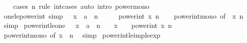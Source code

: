 \begin{isabellebody}
%
\isadelimproof
\ \ %
\endisadelimproof
%
\isatagproof
{}\isamarkupfalse%
\ {\isacharparenleft}{\kern0pt}cases\ n\ rule{\isacharcolon}{\kern0pt}\ int{\isacharunderscore}{\kern0pt}cases{}{\isacharparenright}{\kern0pt}\ {\isacharparenleft}{\kern0pt}auto\ intro{\isacharcolon}{\kern0pt}\ power{\isacharunderscore}{\kern0pt}mono{\isacharparenright}{\kern0pt}%
\endisatagproof
{\isafoldproof}%
%
\isadelimproof
\isanewline
%
\endisadelimproof
\isanewline
{}\isamarkupfalse%
\ one{\isacharunderscore}{\kern0pt}le{\isacharunderscore}{\kern0pt}power{\isacharunderscore}{\kern0pt}int\ {\isacharbrackleft}{\kern0pt}simp{\isacharbrackright}{\kern0pt}{\isacharcolon}{\kern0pt}\ {\isachardoublequoteopen}{}\ {\isasymle}\ {\isacharparenleft}{\kern0pt}x\ {\isacharcolon}{\kern0pt}{\isacharcolon}{\kern0pt}\ {\isacharprime}{\kern0pt}a{\isacharparenright}{\kern0pt}\ {\isasymLongrightarrow}\ n\ {\isasymge}\ {}\ {\isasymLongrightarrow}\ {}\ {\isasymle}\ power{\isacharunderscore}{\kern0pt}int\ x\ n{\isachardoublequoteclose}\isanewline
%
\isadelimproof
\ \ %
\endisadelimproof
%
\isatagproof
{}\isamarkupfalse%
\ power{\isacharunderscore}{\kern0pt}int{\isacharunderscore}{\kern0pt}mono\ {\isacharbrackleft}{\kern0pt}of\ {}\ x\ n{\isacharbrackright}{\kern0pt}\ \isamarkupfalse%
\ simp%
\endisatagproof
{\isafoldproof}%
%
\isadelimproof
\isanewline
%
\endisadelimproof
\isanewline
{}\isamarkupfalse%
\ power{\isacharunderscore}{\kern0pt}int{\isacharunderscore}{\kern0pt}le{\isacharunderscore}{\kern0pt}one{\isacharcolon}{\kern0pt}\ {\isachardoublequoteopen}{}\ {\isasymle}\ {\isacharparenleft}{\kern0pt}x\ {\isacharcolon}{\kern0pt}{\isacharcolon}{\kern0pt}\ {\isacharprime}{\kern0pt}a{\isacharparenright}{\kern0pt}\ {\isasymLongrightarrow}\ n\ {\isasymge}\ {}\ {\isasymLongrightarrow}\ x\ {\isasymle}\ {}\ {\isasymLongrightarrow}\ power{\isacharunderscore}{\kern0pt}int\ x\ n\ {\isasymle}\ {}{\isachardoublequoteclose}\isanewline
%
\isadelimproof
\ \ %
\endisadelimproof
%
\isatagproof
{}\isamarkupfalse%
\ power{\isacharunderscore}{\kern0pt}int{\isacharunderscore}{\kern0pt}mono\ {\isacharbrackleft}{\kern0pt}of\ x\ {}\ n{\isacharbrackright}{\kern0pt}\ \isamarkupfalse%
\ simp%
\endisatagproof
{\isafoldproof}%
%
\isadelimproof
\isanewline
%
\endisadelimproof
\isanewline
{}\isamarkupfalse%
\ power{\isacharunderscore}{\kern0pt}int{\isacharunderscore}{\kern0pt}le{\isacharunderscore}{\kern0pt}imp{\isacharunderscore}{\kern0pt}le{\isacharunderscore}{\kern0pt}exp{\isacharcolon}{\kern0pt}\isanewline

\end{isabellebody}

